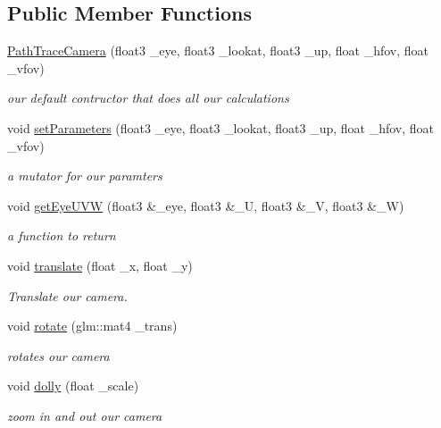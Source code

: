 \subsection*{Public Member Functions}
\begin{DoxyCompactItemize}
\item 
\hyperlink{class_path_trace_camera_ae4a78b282905e582d5d3b3954ecbb6c6}{Path\-Trace\-Camera} (float3 \-\_\-eye, float3 \-\_\-lookat, float3 \-\_\-up, float \-\_\-hfov, float \-\_\-vfov)
\begin{DoxyCompactList}\small\item\em our default contructor that does all our calculations \end{DoxyCompactList}\item 
void \hyperlink{class_path_trace_camera_a5ab2d42a39520558a7d536fca99bdddf}{set\-Parameters} (float3 \-\_\-eye, float3 \-\_\-lookat, float3 \-\_\-up, float \-\_\-hfov, float \-\_\-vfov)
\begin{DoxyCompactList}\small\item\em a mutator for our paramters \end{DoxyCompactList}\item 
void \hyperlink{class_path_trace_camera_aea0823037719057194646b8ff5eb9a2d}{get\-Eye\-U\-V\-W} (float3 \&\-\_\-eye, float3 \&\-\_\-\-U, float3 \&\-\_\-\-V, float3 \&\-\_\-\-W)
\begin{DoxyCompactList}\small\item\em a function to return \end{DoxyCompactList}\item 
void \hyperlink{class_path_trace_camera_a552d6fd15505df0553fc1c87a7520848}{translate} (float \-\_\-x, float \-\_\-y)
\begin{DoxyCompactList}\small\item\em Translate our camera. \end{DoxyCompactList}\item 
void \hyperlink{class_path_trace_camera_a96f2c8e5b33f2d2503891c4d9c431948}{rotate} (glm\-::mat4 \-\_\-trans)
\begin{DoxyCompactList}\small\item\em rotates our camera \end{DoxyCompactList}\item 
void \hyperlink{class_path_trace_camera_a28b8c742021899cc72760977ad864764}{dolly} (float \-\_\-scale)
\begin{DoxyCompactList}\small\item\em zoom in and out our camera \end{DoxyCompactList}\end{DoxyCompactItemize}
